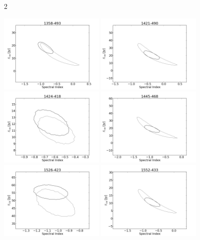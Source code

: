 \documentclass[preprint]{aastex}
\begin{document}
\begin{figure}[htbp]2\begin{center}
\includegraphics[width=2in]{plots/1358-493_SI_MCMC.png} %
\includegraphics[width=2in]{plots/1421-490_SI_MCMC.png} %
\includegraphics[width=2in]{plots/1424-418_SI_MCMC.png} %
\includegraphics[width=2in]{plots/1445-468_SI_MCMC.png} %
\includegraphics[width=2in]{plots/1526-423_SI_MCMC.png} %
\includegraphics[width=2in]{plots/1552-433_SI_MCMC.png} %

\end{center}
\end{figure}
\end{document}
